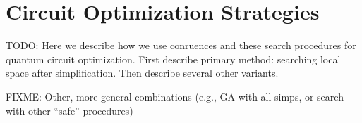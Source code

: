\section{Circuit Optimization Strategies}

TODO: Here we describe how we use conruences and these search procedures for quantum circuit optimization. First describe primary method: searching local space after simplification. Then describe several other variants.

FIXME: Other, more general combinations (e.g., GA with all simps, or search with other ``safe'' procedures)


